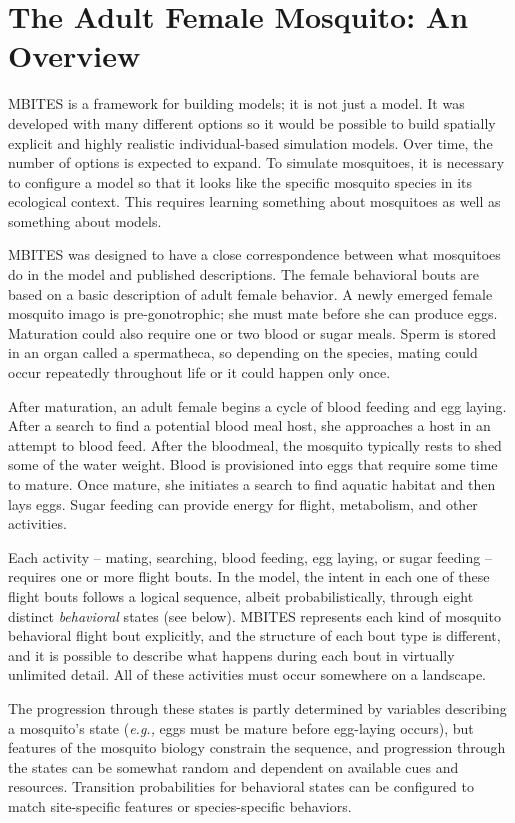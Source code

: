 \documentclass{article}
\newcommand{\eg}{{\em e.g., }}
\begin{document}
\clearpage 

\section{The Adult Female Mosquito: An Overview}

MBITES is a framework for building models; it is not just a model. It was developed with many different options so it would be possible to build spatially explicit and highly realistic individual-based simulation models. Over time, the number of options is expected to expand. To simulate mosquitoes, it is necessary to configure a model so that it looks like the specific mosquito species in its ecological context.  This requires learning something about mosquitoes as well as something about models. 

MBITES was designed to have a close correspondence between what mosquitoes do in the model and published descriptions. The female behavioral bouts are based on a basic description of adult female behavior. A newly emerged female mosquito imago is pre-gonotrophic; she must mate before she can produce eggs. Maturation could also require one or two blood or sugar meals. Sperm is stored in an organ called a spermatheca, so depending on the species, mating could occur repeatedly throughout life or it could happen only once. 

After maturation, an adult female begins a cycle of blood feeding and egg laying. After a search to find a potential blood meal host, she approaches a host in an attempt to blood feed. After the bloodmeal, the mosquito typically rests to shed some of the water weight. Blood is provisioned into eggs that require some time to mature. Once mature, she initiates a search to find aquatic habitat and then lays eggs. Sugar feeding can provide energy for flight, metabolism, and other activities.

Each activity -- mating, searching, blood feeding, egg laying, or sugar feeding -- requires one or more flight bouts. In the model, the intent in each one of these flight bouts follows a logical sequence, albeit probabilistically, through eight distinct {\em behavioral} states (see below). MBITES represents each kind of mosquito behavioral flight bout explicitly, and the structure of each bout type is different, and it is possible to describe what happens during each bout in virtually unlimited detail. All of these activities must occur somewhere on a landscape. 

The progression through these states is partly determined by variables describing a mosquito's state (\eg eggs must be mature before egg-laying occurs), but features of the mosquito biology constrain the sequence, and progression through the states can be somewhat random and dependent on available cues and resources. Transition probabilities for behavioral states can be configured to match site-specific features or species-specific behaviors.
\end{document}
